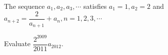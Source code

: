 The sequence $a_1,a_2,a_3,\cdots$ satisfies $a_1 = 1,a_2 = 2$ and $a_{n + 2} = \dfrac{2}{a_{n + 1}} + a_n, n = 1,2,3,\cdots$



Evaluate $\dfrac{2^{2009}}{2011} a_{2012}.$
